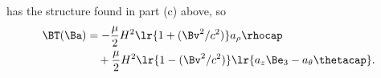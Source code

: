  has the structure found in part (c) above, so
\begin{equation}\label{eqn:poyntingStaticExamples:1380}
\begin{aligned}
\BT(\Ba)
&=
-\frac{\mu}{2} H^2 \lr{ 1 + (\Bv^2/c^2) } a_\rho \rhocap \\
&\quad +
\frac{\mu}{2} H^2 \lr{ 1 - (\Bv^2/c^2) } \lr{ a_z \Be_3 - a_\theta \thetacap }.
\end{aligned}
\end{equation}
